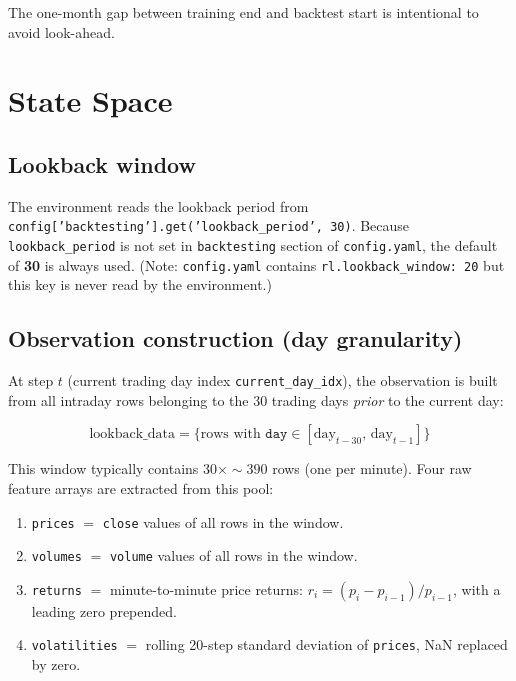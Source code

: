 \documentclass[11pt,a4paper]{article}
\begin{document}
The one-month gap between training end and backtest start is intentional to avoid look-ahead.

\section{State Space}
\label{sec:state}

\subsection{Lookback window}

The environment reads the lookback period from \texttt{config['backtesting'].get('lookback\_period', 30)}. Because \texttt{lookback\_period} is not set in \texttt{backtesting} section of \texttt{config.yaml}, the default of \textbf{30} is always used. (Note: \texttt{config.yaml} contains \texttt{rl.lookback\_window: 20} but this key is never read by the environment.)

\subsection{Observation construction (day granularity)}

At step $t$ (current trading day index \texttt{current\_day\_idx}), the observation is built from all intraday rows belonging to the 30 trading days \emph{prior} to the current day:

\[
  \text{lookback\_data} = \bigl\{ \text{rows with } \texttt{day} \in [\text{day}_{t-30},\, \text{day}_{t-1}] \bigr\}
\]

This window typically contains $30 \times \sim\!390$ rows (one per minute). Four raw feature arrays are extracted from this pool:

\begin{enumerate}
  \item \texttt{prices} $=$ \texttt{close} values of all rows in the window.
  \item \texttt{volumes} $=$ \texttt{volume} values of all rows in the window.
  \item \texttt{returns} $=$ minute-to-minute price returns: $r_i = (p_i - p_{i-1})/p_{i-1}$, with a leading zero prepended.
  \item \texttt{volatilities} $=$ rolling 20-step standard deviation of \texttt{prices}, NaN replaced by zero.
\end{enumerate}
\end{document}
